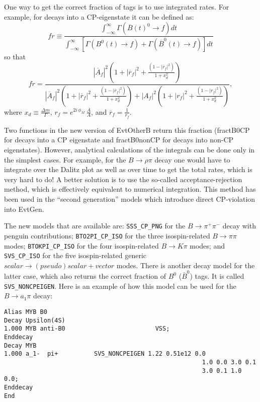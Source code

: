 One way to get the correct fraction of tags is to use integrated rates.  For example, for decays into a CP-eigenstate it can be defined as:
\begin{equation}
fr \equiv \frac{\int_{-\infty}^{\infty}\Gamma(\overline{B}(t)^{0} \rightarrow f)dt}{\int_{-\infty}^{\infty}\left[\Gamma(B^{0}(t) \rightarrow f) + \Gamma(\overline{B}^{0}(t) \rightarrow f)\right]dt} 
\end{equation}
so that
\begin{equation}
fr = \frac{|\overline{A}_{f}|^2 \left(1 + |\overline{r}_{f}|^2 + \frac{(1 - |\overline{r}_{f}|^2)}{1+x_{d}^2} \right)}{|\overline{A}_{f}|^2 \left(1 + |\overline{r}_{f}|^2 + \frac{(1 - |\overline{r}_{f}|^2)}{1+x_{d}^2} \right) + |{A}_{f}|^2 \left(1 + |r_{f}|^2 + \frac{(1 - |r_{f}|^2)}{1+x_{d}^2} \right)},
\end{equation}
where $x_{d} \equiv \frac{\Delta m}{\Gamma}$, $r_{f} = e^{2i\,\phi_{M}}\,\frac{\overline{A}}{A}$, and $\overline{r}_{f} = \frac{1}{r_{f}}$.

Two functions in the new version of EvtOtherB return this fraction (fractB0CP for decays into a CP eigenstate and fractB0nonCP for decays into non-CP eigenstates).  However, analytical calculations of the integrals can be done only in the simplest cases.  For example, for the $B \rightarrow \rho \pi$ decay one would have to integrate over the Dalitz plot as well as over time to get the total rates, which is very hard to do!  A better solution is to use the so-called acceptance-rejection method, which is effectively equivalent to numerical integration.  This method has been used in the ``second generation'' models which introduce direct CP-violation into EvtGen.

  The new models that are available are: {\tt SSS\_CP\_PNG} for the $B \rightarrow \pi^{+} \pi^{-}$ decay with penguin contributions; {\tt BTO2PI\_CP\_ISO} for the three isospin-related $B\rightarrow \pi \pi$ modes; {\tt BTOKPI\_CP\_ISO} for the four isospin-related $B \rightarrow K \pi$ modes; and {\tt SVS\_CP\_ISO} for the five isospin-related generic $scalar \rightarrow (pseudo)scalar + vector$ modes.  There is another decay model for the latter case, which also returns the correct fraction of $B^0$ ($\bar B^0$) tags.  It is called {\tt SVS\_NONCPEIGEN}.  Here is an example of how this model can be used for the $B \rightarrow a_1 \pi$ decay:
\begin{verbatim}
Alias MYB B0
Decay Upsilon(4S)
1.000 MYB anti-B0                         VSS;
Enddecay
Decay MYB
1.000 a_1-  pi+          SVS_NONCPEIGEN 1.22 0.51e12 0.0 
                                                       1.0 0.0 3.0 0.1 
                                                       3.0 0.1 1.0 0.0;
Enddecay
End
\end{verbatim}

